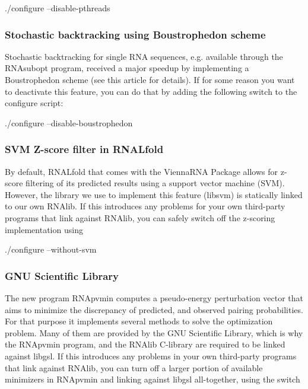 \begin{DoxyVerb}./configure --disable-pthreads
\end{DoxyVerb}
\hypertarget{install_config_boustrophedon}{}\subsubsection{Stochastic backtracking using Boustrophedon scheme}\label{install_config_boustrophedon}
Stochastic backtracking for single R\+NA sequences, e.\+g. available through the R\+N\+Asubopt program, received a major speedup by implementing a Boustrophedon scheme (see this article for details). If for some reason you want to deactivate this feature, you can do that by adding the following switch to the configure script\+:

\begin{DoxyVerb}./configure --disable-boustrophedon
\end{DoxyVerb}
\hypertarget{install_config_svm}{}\subsubsection{S\+V\+M Z-\/score filter in R\+N\+A\+Lfold}\label{install_config_svm}
By default, R\+N\+A\+Lfold that comes with the Vienna\+R\+NA Package allows for z-\/score filtering of its predicted results using a support vector machine (S\+VM). However, the library we use to implement this feature (libsvm) is statically linked to our own R\+N\+Alib. If this introduces any problems for your own third-\/party programs that link against R\+N\+Alib, you can safely switch off the z-\/scoring implementation using

\begin{DoxyVerb}./configure --without-svm
\end{DoxyVerb}
\hypertarget{install_config_gsl}{}\subsubsection{G\+N\+U Scientific Library}\label{install_config_gsl}
The new program R\+N\+Apvmin computes a pseudo-\/energy perturbation vector that aims to minimize the discrepancy of predicted, and observed pairing probabilities. For that purpose it implements several methods to solve the optimization problem. Many of them are provided by the G\+NU Scientific Library, which is why the R\+N\+Apvmin program, and the R\+N\+Alib C-\/library are required to be linked against libgsl. If this introduces any problems in your own third-\/party programs that link against R\+N\+Alib, you can turn off a larger portion of available minimizers in R\+N\+Apvmin and linking against libgsl all-\/together, using the switch


